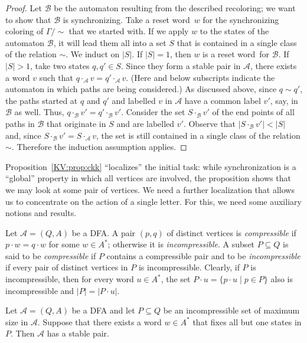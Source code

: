\documentclass{irmaart}
\newcommand{\sw}{reset word}
\theoremstyle{plain}
\begin{document}
\begin{proof}
Let $\mathcal{B}$ be the automaton resulting from the described recoloring; we
want to show that $\mathcal{B}$ is synchronizing. Take a \sw\ $w$ for the
synchronizing coloring of $\Gamma/\!\!\!\sim$ that we started with. If we apply
$w$ to the states of the automaton $\mathcal{B}$, it will lead them all into a
set $S$ that is contained in a single class of the relation $\sim$. We induct
on $|S|$. If $|S|=1$, then $w$ is a \sw\ for $\mathcal{B}$. If $|S|>1$, take
two states $q,q'\in S$. Since they form a stable pair in $\mathcal{A}$, there
exists a word $v$ such that $q\cdot_{\mathcal{A}}v=q'\cdot_{\mathcal{A}}v$.
(Here and below subscripts indicate the automaton in which paths are being
considered.) As discussed above, since $q\sim q'$, the paths started at $q$ and
$q'$ and labelled $v$ in $\mathcal{A}$ have a common label $v'$, say, in
$\mathcal{B}$ as well. Thus, $q\cdot_{\mathcal{B}}v'=q'\cdot_{\mathcal{B}} v'$.
Consider the set $S\cdot_{\mathcal{B}}v'$ of the end points of all paths in
$\mathcal{B}$ that originate in $S$ and are labelled $v'$. Observe that
$|S\cdot_{\mathcal{B}}v'|<|S|$ and, since
$S\cdot_{\mathcal{B}}v'=S\cdot_{\mathcal{A}}v$, the set is still contained in a
single class of the relation $\sim$. Therefore the induction assumption
applies.
\end{proof}

Proposition~\ref{KV:prop:ckk} ``localizes'' the initial task: while
synchronization is a ``global'' property in which all vertices are involved,
the proposition shows that we may look at some pair of vertices. We need a
further localization that allows us to concentrate on the action of a single
letter. For this, we need some auxiliary notions and results.

Let $\mathcal{A}=(Q,A)$ be a DFA. A pair $(p,q)$ of distinct vertices is
\emph{compressible} if $p\cdot w=q\cdot w$ for some $w\in A^*$; otherwise it
is \emph{incompressible}. A
subset $P\subseteq Q$ is said to be \emph{compressible}
if $P$ contains a compressible pair and to be \emph{incompressible} if every
pair of distinct vertices in $P$ is incompressible.
Clearly, if $P$ is incompressible, then for every word $u\in A^*$, the set
$P\cdot u=\{p\cdot u\mid p\in P\}$ also is incompressible and $|P|=|P\cdot u|$.

\begin{lemma}
\label{KV:lemma:maximal incompressible} Let $\mathcal{A}=(Q,A)$ be a DFA and
let $P\subseteq Q$ be an incompressible set of maximum size in $\mathcal{A}$.
Suppose that there exists a word $w\in A^*$ that fixes all but one states in
$P$. Then $\mathcal{A}$ has a stable pair.
\end{lemma}
\end{document}
